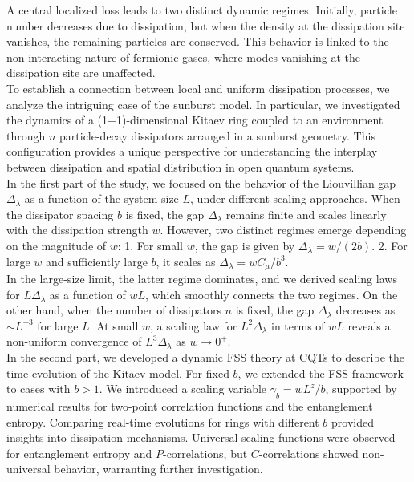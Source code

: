{    A central localized loss leads to two distinct dynamic regimes. Initially, particle number decreases due to dissipation, but when the density at the dissipation site vanishes, the remaining particles are conserved. This behavior is linked to the non-interacting nature of fermionic gases, where modes vanishing at the dissipation site are unaffected.
    \\$ $\\
    To establish a connection between local and uniform dissipation processes, we analyze the intriguing case of the sunburst model.
    In particular, we investigated the dynamics of a (1+1)-dimensional Kitaev ring coupled to an environment through \( n \) particle-decay dissipators arranged in a sunburst geometry. This configuration provides a unique perspective for understanding the interplay between dissipation and spatial distribution in open quantum systems.\\
    In the first part of the study, we focused on the behavior of the Liouvillian gap \( \Delta_\lambda \) as a function of the system size \( L \), under different scaling approaches. When the dissipator spacing \( b \) is fixed, the gap \( \Delta_\lambda \) remains finite and scales linearly with the dissipation strength \( w \). However, two distinct regimes emerge depending on the magnitude of \( w \): 
    1. For small \( w \), the gap is given by \( \Delta_\lambda = w/(2b) \).
    2. For large \( w \) and sufficiently large \( b \), it scales as \( \Delta_\lambda = wC_\mu/b^3 \).\\
    In the large-size limit, the latter regime dominates, and we derived scaling laws for \( L\Delta_\lambda \) as a function of \( wL \), which smoothly connects the two regimes. On the other hand, when the number of dissipators \( n \) is fixed, the gap \( \Delta_\lambda \) decreases as \( \sim L^{-3} \) for large \( L \). At small \( w \), a scaling law for \( L^2\Delta_\lambda \) in terms of \( wL \) reveals a non-uniform convergence of \( L^3\Delta_\lambda \) as \( w \to 0^+ \).\\
    In the second part, we developed a dynamic FSS theory at CQTs to describe the time evolution of the Kitaev model. For fixed \( b \), we extended the FSS framework to cases with \( b > 1 \). We introduced a scaling variable \( \gamma_b = wL^z/b \), supported by numerical results for two-point correlation functions and the entanglement entropy. Comparing real-time evolutions for rings with different \( b \) provided insights into dissipation mechanisms. Universal scaling functions were observed for entanglement entropy and \( P \)-correlations, but \( C \)-correlations showed non-universal behavior, warranting further investigation.\\
}
